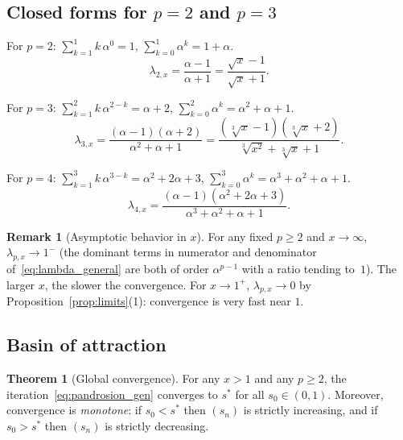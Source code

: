 \documentclass[11pt,a4paper]{article}
\theoremstyle{definition}
\newtheorem{theorem}{Theorem}[section]
\newtheorem{remark}{Remark}[section]
\newcommand{\cbrt}[1]{\sqrt[3]{#1}}
\begin{document}
\subsection{Closed forms for \texorpdfstring{$p=2$}{p=2} and \texorpdfstring{$p=3$}{p=3}}

For $p = 2$: $\sum_{k=1}^{1} k\,\alpha^{0} = 1$, $\sum_{k=0}^{1}\alpha^k = 1 + \alpha$.
\begin{equation}
  \label{eq:lambda2}
  \lambda_{2,x} = \frac{\alpha - 1}{\alpha + 1} = \frac{\sqrt{x} - 1}{\sqrt{x} + 1}.
\end{equation}

For $p = 3$: $\sum_{k=1}^{2} k\,\alpha^{2-k} = \alpha + 2$, $\sum_{k=0}^{2}\alpha^k = \alpha^2+\alpha+1$.
\begin{equation}
  \label{eq:lambda3}
  \lambda_{3,x} = \frac{(\alpha-1)(\alpha+2)}{\alpha^2 + \alpha + 1} = \frac{(\cbrt{x}-1)(\cbrt{x}+2)}{\cbrt{x^2}+\cbrt{x}+1}.
\end{equation}

For $p = 4$: $\sum_{k=1}^{3}k\,\alpha^{3-k} = \alpha^2 + 2\alpha + 3$, $\sum_{k=0}^{3}\alpha^k = \alpha^3+\alpha^2+\alpha+1$.
\begin{equation}
  \label{eq:lambda4}
  \lambda_{4,x} = \frac{(\alpha-1)(\alpha^2+2\alpha+3)}{\alpha^3+\alpha^2+\alpha+1}.
\end{equation}

\begin{remark}[Asymptotic behavior in $x$]
For any fixed $p \geq 2$ and $x \to \infty$, $\lambda_{p,x} \to 1^-$ (the dominant terms in numerator and denominator of~\eqref{eq:lambda_general} are both of order $\alpha^{p-1}$ with a ratio tending to~$1$). The larger $x$, the slower the convergence. For $x \to 1^+$, $\lambda_{p,x} \to 0$ by Proposition~\ref{prop:limits}(1): convergence is very fast near $1$.
\end{remark}

\subsection{Basin of attraction}

\begin{theorem}[Global convergence]
\label{thm:bassin}
For any $x > 1$ and any $p \geq 2$, the iteration~\eqref{eq:pandrosion_gen} converges to $s^*$ for all $s_0 \in (0,1)$. Moreover, convergence is \emph{monotone}: if $s_0 < s^*$ then $(s_n)$ is strictly increasing, and if $s_0 > s^*$ then $(s_n)$ is strictly decreasing.
\end{theorem}
\end{document}

